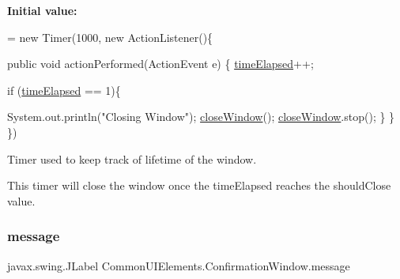 {\bfseries Initial value\+:}
\begin{DoxyCode}
= \textcolor{keyword}{new} Timer(1000, \textcolor{keyword}{new} ActionListener()\{
       
        \textcolor{keyword}{public} \textcolor{keywordtype}{void} actionPerformed(ActionEvent e) \{
            \hyperlink{classCommonUIElements_1_1ConfirmationWindow_a74e97a157709ec31ca3f48ff124c210c}{timeElapsed}++; 
           
            \textcolor{keywordflow}{if} (\hyperlink{classCommonUIElements_1_1ConfirmationWindow_a74e97a157709ec31ca3f48ff124c210c}{timeElapsed} == 1)\{
                
                System.out.println(\textcolor{stringliteral}{"Closing Window"}); 
                \hyperlink{classCommonUIElements_1_1ConfirmationWindow_ab3b4932646ddf67d77e6de3033d07176}{closeWindow}(); 
                \hyperlink{classCommonUIElements_1_1ConfirmationWindow_ab3b4932646ddf67d77e6de3033d07176}{closeWindow}.stop();
            \}       
        \}   
        \})
\end{DoxyCode}


Timer used to keep track of lifetime of the window. 

This timer will close the window once the \textquotesingle{}time\+Elapsed\textquotesingle{} reaches the \textquotesingle{}should\+Close\textquotesingle{} value. \mbox{\label{classCommonUIElements_1_1ConfirmationWindow_a5161ae2950ae7a12018c207a7d0ab1d5}} 
\subsubsection{\texorpdfstring{message}{message}}
{\footnotesize\ttfamily javax.\+swing.\+J\+Label Common\+U\+I\+Elements.\+Confirmation\+Window.\+message\hspace{0.3cm}{\ttfamily [private]}}

\mbox{\label{classCommonUIElements_1_1ConfirmationWindow_ae9ba201fcec4a227a32aa9dd18f8224f}} 
